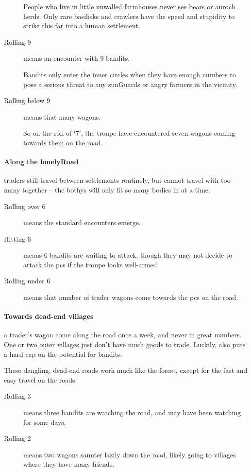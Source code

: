 \begin{multicols}{2}
\begin{description}
  People who live in little unwalled farmhouses never see bears or auroch herds.
  Only rare \glspl{basilisk} and \glspl{crawler} have the speed and stupidity to strike this far into a human settlement.
  \item[Rolling 9]
  means an encounter with 9 bandits.

  Bandits only enter the inner circles when they have enough numbers to pose a serious threat to any \glspl{sunGuard} or angry farmers in the vicinity.
  \item[Rolling below 9]
  means that many wagons.

  So on the roll of `7', the troupe have encountered seven wagons coming towards them on the road.
\end{description}

\paragraph{Along the \gls{lonelyRoad}}
traders still travel between settlements routinely, but cannot travel with too many together -- the \glspl{bothy} will only fit so many bodies in at a time.

\null
\begin{description}
  \item[Rolling over 6] means the standard encounters emerge.
  \item[Hitting 6] means 6 bandits are waiting to attack, though they may not decide to attack the \glspl{pc} if the troupe looks well-armed.
  \item[Rolling under 6]
  means that number of trader wagons come towards the \glspl{pc}
  on the road.
\end{description}

\paragraph{Towards dead-end \glspl{village}}
a trader's wagon come along the road once a week, and never in great numbers.
One or two outer \glspl{village} just don't have much goods to trade.
Luckily, also puts a hard cap on the potential for bandits.

These dangling, dead-end roads work much like the forest, except for the fast and easy travel on the roads.

\begin{description}
  \item[Rolling 3]
  means three bandits are watching the road, and may have been watching for some days.
  \item[Rolling 2]
  means two wagons saunter lazily down the road, likely going to \glspl{village} where they have many friends.
\end{description}


\end{multicols}
